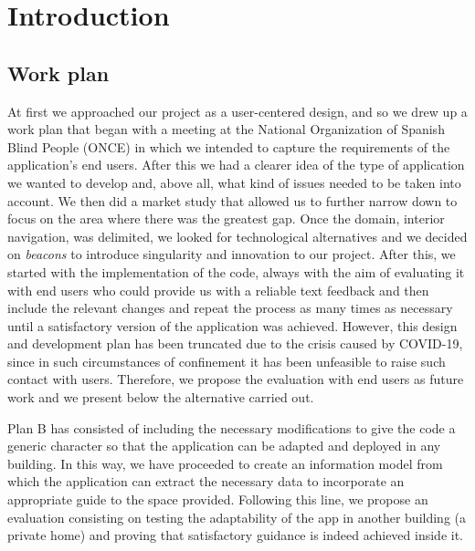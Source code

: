 \chapter{Introduction}
\label{cap:introduction}





\section{Work plan}
\label{sec:workPlan}


At first we approached our project as a user-centered design, and so we drew up a work plan that began with a meeting at the National Organization of Spanish Blind People (ONCE) in which we intended to capture the requirements of the application's end users. After this we had a clearer idea of the type of application we wanted to develop and, above all, what kind of issues needed to be taken into account. We then did a market study that allowed us to further narrow down to focus on the area where there was the greatest gap. Once the domain, interior navigation, was delimited, we looked for technological alternatives and we decided on \textit{beacons} to introduce singularity and innovation to our project. After this, we started with the implementation of the code, always with the aim of evaluating it with end users who could provide us with a reliable text feedback and then include the relevant changes and repeat the process as many times as necessary until a satisfactory version of the application was achieved. However, this design and development plan has been truncated due to the crisis caused by COVID-19, since in such circumstances of confinement it has been unfeasible to raise such contact with users. Therefore, we propose the evaluation with end users as future work and we present below the alternative carried out.

Plan B has consisted of including the necessary modifications to give the code a generic character so that the application can be adapted and deployed in any building. In this way, we have proceeded to create an information model from which the application can extract the necessary data to incorporate an appropriate guide to the space provided. Following this line, we propose an evaluation consisting on testing the adaptability of the app in another building (a private home) and proving that satisfactory guidance is indeed achieved inside it.


